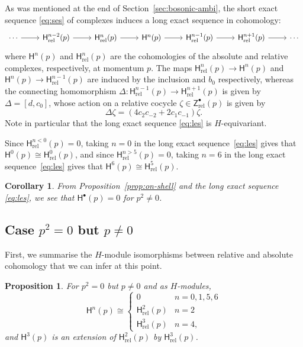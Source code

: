 \documentclass[11pt,reqno,a4paper,final]{amsart}
\theoremstyle{plain}
\newtheorem{proposition}[lemma]{Proposition}
\newtheorem{corollary}[lemma]{Corollary}
\theoremstyle{definition}
\newcommand{\sH}{\mathsf{H}}
\newcommand{\Hrel}{\mathsf{H}_{\mathrm{rel}}}
\newcommand{\Zrel}{\mathsf{Z}_{\mathrm{rel}}}
\newcommand{\1}{\mathbb{1}}
\numberwithin{equation}{section}
\begin{document}
As was mentioned at the end of Section~\ref{sec:bosonic-ambi}, the
short exact sequence \eqref{eq:ses} of complexes induces a long exact
sequence in cohomology:
\begin{equation}
  \label{eq:les}
  \begin{tikzcd}
    \cdots \arrow[r] & \Hrel^{n-2}(p) \arrow[r] & \Hrel^n(p) \arrow[r] & \sH^n(p) \arrow[r] & \Hrel^{n-1}(p)
    \arrow[r] & \Hrel^{n+1}(p) \arrow[r] & \cdots
  \end{tikzcd}
\end{equation}
where $\sH^n(p)$ and $\Hrel^n(p)$ are the cohomologies of the absolute and
relative complexes, respectively, at momentum $p$.  The maps
$\Hrel^n(p) \to \sH^n(p)$ and $\sH^n(p) \to \Hrel^{n-1}(p)$ are
induced by the inclusion and $b_0$ respectively, whereas the
connecting homomorphism $\Delta: \Hrel^{n-1}(p) \to \Hrel^{n+1}(p)$ is given
by $\Delta = [d,c_0]$, whose action on a relative cocycle $\zeta \in \Zrel^\bullet(p)$ is
given by
\begin{equation}
  \Delta \zeta = (4 c_2 c_{-2} + 2 c_1 c_{-1}) \zeta.
\end{equation}
Note in particular that the long exact sequence \eqref{eq:les} is $H$-equivariant.

Since $\Hrel^{n<0}(p)=0$, taking $n=0$ in the long exact
sequence~\eqref{eq:les} gives that $\sH^0(p) \cong \Hrel^0(p)$, and
since $\Hrel^{n>5}(p)=0$, taking $n=6$ in the long exact
sequence~\eqref{eq:les} gives that $\sH^6(p) \cong \Hrel^5(p)$.

\begin{corollary}
  From Proposition~\ref{prop:on-shell} and the long exact sequence
  \eqref{eq:les}, we see that $\sH^\bullet(p) = 0$ for $p^2 \neq 0$.
\end{corollary}

\subsection{Case $p^2=0$ but $p\neq 0$}
\label{sec:nonzero-massless}

First, we summarise the $H$-module isomorphisms between relative and
absolute cohomology that we can infer at this point.

\begin{proposition}
  \label{prop:Summary-H}
  For $p^2=0$ but $p \neq 0$ and as $H$-modules,
  \begin{equation}
    \sH^n(p) \cong
    \begin{cases}
      0 & n = 0,1,5,6\\
      \Hrel^2(p) &   n=2\\
      \Hrel^3(p) & n=4,
    \end{cases}
  \end{equation}
  and $\sH^3(p)$ is an extension of $\Hrel^2(p)$ by $\Hrel^3(p)$.
\end{proposition}
\end{document}
